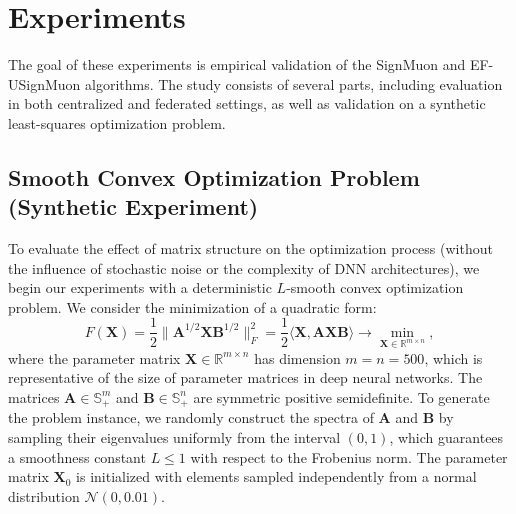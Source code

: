 \documentclass{article}
\begin{document}
\section{Experiments}\label{sec:exp}
The goal of these experiments is empirical validation of the SignMuon and EF-USignMuon algorithms. The study consists of several parts, including evaluation in both centralized and federated settings, as well as validation on a synthetic least-squares optimization problem.

\subsection{Smooth Convex Optimization Problem (Synthetic Experiment)}
To evaluate the effect of matrix structure on the optimization process (without the influence of stochastic noise or the complexity of DNN architectures), we begin our experiments with a deterministic $L$-smooth convex optimization problem. We consider the minimization of a quadratic form:
\begin{equation}
F(\mathbf{X}) = \frac{1}{2} \|\mathbf{A}^{1/2} \mathbf{X} \mathbf{B}^{1/2}\|_F^2 = \frac{1}{2} \langle \mathbf{X}, \mathbf{A} \mathbf{X} \mathbf{B} \rangle \to \min_{\mathbf{X} \in \mathbb{R}^{m \times n}},
\label{eq:synthetic_problem}
\end{equation}
where the parameter matrix $\mathbf{X} \in \mathbb{R}^{m \times n}$ has dimension $m = n = 500$, which is representative of the size of parameter matrices in deep neural networks. The matrices $\mathbf{A} \in \mathbb{S}_+^m$ and $\mathbf{B} \in \mathbb{S}_+^n$ are symmetric positive semidefinite. To generate the problem instance, we randomly construct the spectra of $\mathbf{A}$ and $\mathbf{B}$ by sampling their eigenvalues uniformly from the interval $(0, 1)$, which guarantees a smoothness constant $L \le 1$ with respect to the Frobenius norm. The parameter matrix $\mathbf{X}_0$ is initialized with elements sampled independently from a normal distribution $\mathcal{N}(0, 0.01)$.
\end{document}

